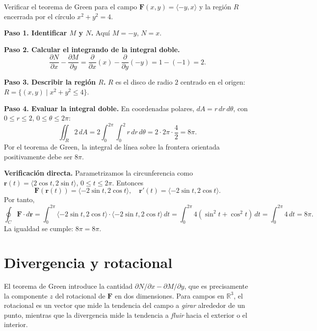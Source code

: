 \begin{example}
Verificar el teorema de Green para el campo $\mathbf{F}(x,y) =
\langle -y, x \rangle$ y la región $R$ encerrada por el círculo
$x^2+y^2=4$.
\begin{myproof}
\textbf{Paso 1. Identificar $M$ y $N$.}
Aquí $M=-y$, $N=x$.

\textbf{Paso 2. Calcular el integrando de la integral doble.}
\[
\frac{\partial N}{\partial x} - \frac{\partial M}{\partial y}
= \frac{\partial}{\partial x}(x) - \frac{\partial}{\partial y}(-y)
= 1 - (-1) = 2.
\]

\textbf{Paso 3. Describir la región $R$.}
$R$ es el disco de radio $2$ centrado en el origen:
$R = \{(x,y) \mid x^2+y^2 \le 4\}$.

\textbf{Paso 4. Evaluar la integral doble.}
En coordenadas polares, $dA = r\,dr\,d\theta$, con $0 \le r \le 2$,
$0 \le \theta \le 2\pi$:
\[
\iint_R 2\,dA = 2 \int_0^{2\pi} \int_0^2 r\,dr\,d\theta
= 2 \cdot 2\pi \cdot \frac{4}{2} = 8\pi.
\]
Por el teorema de Green, la integral de línea sobre la frontera
orientada positivamente debe ser $8\pi$.

\textbf{Verificación directa.}
Parametrizamos la circunferencia como $\mathbf{r}(t)=\langle 2\cos t,
2\sin t \rangle$, $0 \le t \le 2\pi$. Entonces
\[
\mathbf{F}(\mathbf{r}(t)) = \langle -2\sin t, 2\cos t \rangle,
\quad \mathbf{r}'(t) = \langle -2\sin t, 2\cos t \rangle.
\]
Por tanto,
\[
\oint_C \mathbf{F}\cdot d\mathbf{r}
= \int_0^{2\pi} \langle -2\sin t, 2\cos t \rangle \cdot
\langle -2\sin t, 2\cos t \rangle \, dt
= \int_0^{2\pi} 4(\sin^2 t + \cos^2 t)\,dt
= \int_0^{2\pi} 4\,dt = 8\pi.
\]
La igualdad se cumple: $\boxed{8\pi = 8\pi}$.
\end{myproof}
\end{example}

\section{Divergencia y rotacional}

El teorema de Green introduce la cantidad $\partial N/\partial x -
\partial M/\partial y$, que es precisamente la componente $z$ del
rotacional de $\mathbf{F}$ en dos dimensiones. Para campos en
$\mathbb{R}^3$, el rotacional es un vector que mide la tendencia del
campo a \emph{girar} alrededor de un punto, mientras que la divergencia
mide la tendencia a \emph{fluir} hacia el exterior o el interior.

